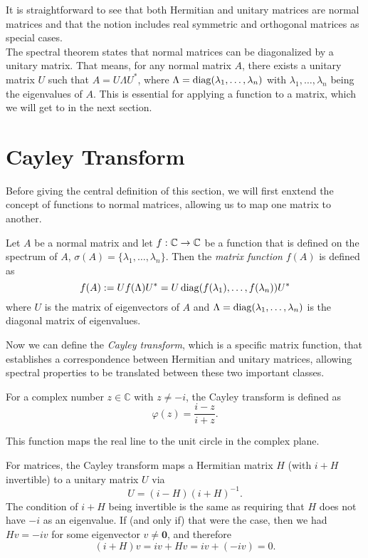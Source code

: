 It is straightforward to see that both Hermitian and unitary matrices are normal matrices
and that the notion includes real symmetric and orthogonal matrices as special cases.\\
The spectral theorem states that normal matrices can be diagonalized by a unitary matrix.
That means, for any normal matrix $A$, there exists a unitary matrix $U$ such that $A = U \Lambda U^*$,
where $\Lambda = \operatorname{diag}(\lambda_1, \ldots, \lambda_n)$ with $\lambda_1, \ldots, \lambda_n$ being the eigenvalues of $A$.
This is essential for applying a function to a matrix, which we will get to in the next section.

\section{Cayley Transform}

Before giving the central definition of this section,
we will first enxtend the concept of functions to normal matrices,
allowing us to map one matrix to another.

\begin{definition}
    Let $A$ be a normal matrix and let $f: \mathbb{C} \to \mathbb{C}$ be a function that is defined on the spectrum of $A$,
    $\sigma(A) = \{\lambda_1, \ldots, \lambda_n\}$.
    Then the \emph{matrix function} $f(A)$ is defined as
    \[
    f(A) := U f(\Lambda) U^* = U \operatorname{diag}(f(\lambda_1), \ldots, f(\lambda_n)) U^*
    \]
    where $U$ is the matrix of eigenvectors of $A$ and $\Lambda = \operatorname{diag}(\lambda_1, \ldots, \lambda_n)$ is the diagonal matrix of eigenvalues.
\end{definition}

Now we can define the \emph{Cayley transform}, which is a specific matrix function, 
that establishes a correspondence between Hermitian and unitary matrices,
allowing spectral properties to be translated between these two important classes.

For a complex number $z \in \mathbb{C}$ with $z \neq -i$, the Cayley transform is defined as
\[
\varphi(z) = \frac{i - z}{i + z}.
\]

This function maps the real line to the unit circle in the complex plane.

\vspace{0.5cm}



For matrices, the Cayley transform maps a Hermitian matrix $H$ (with $i + H$ invertible) to a unitary matrix $U$ via
\[
U = (i - H)(i + H)^{-1}.
\]
The condition of $i + H$ being invertible is the same as requiring that $H$ does not have $-i$ as an eigenvalue.
If (and only if) that were the case, then we had $H v = -i v$ for some eigenvector $v \neq \mathbf{0}$,
and therefore 
\[
(i + H) v = i v + H v = i v + (-i v) = 0.
\]

